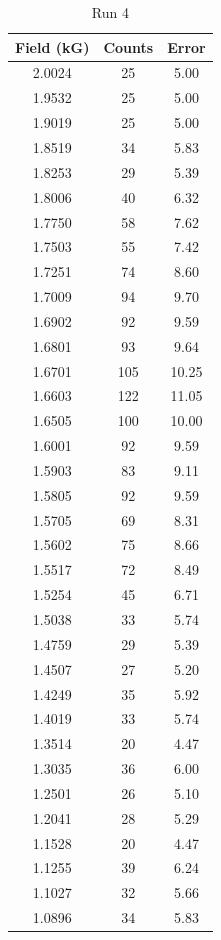 \begin{table}[h!]
\caption{Run 4}
\begin{tabular}{|c|c|c|} \hline
Field (kG)	&	Counts	&	Error	\\ \hline
2.0024	&	25	&	5.00	\\ \hline
1.9532	&	25	&	5.00	\\ \hline
1.9019	&	25	&	5.00	\\ \hline
1.8519	&	34	&	5.83	\\ \hline
1.8253	&	29	&	5.39	\\ \hline
1.8006	&	40	&	6.32	\\ \hline
1.7750	&	58	&	7.62	\\ \hline
1.7503	&	55	&	7.42	\\ \hline
1.7251	&	74	&	8.60	\\ \hline
1.7009	&	94	&	9.70	\\ \hline
1.6902	&	92	&	9.59	\\ \hline
1.6801	&	93	&	9.64	\\ \hline
1.6701	&	105	&	10.25	\\ \hline
1.6603	&	122	&	11.05	\\ \hline
1.6505	&	100	&	10.00	\\ \hline
1.6001	&	92	&	9.59	\\ \hline
1.5903	&	83	&	9.11	\\ \hline
1.5805	&	92	&	9.59	\\ \hline
1.5705	&	69	&	8.31	\\ \hline
1.5602	&	75	&	8.66	\\ \hline
1.5517	&	72	&	8.49	\\ \hline
1.5254	&	45	&	6.71	\\ \hline
1.5038	&	33	&	5.74	\\ \hline
1.4759	&	29	&	5.39	\\ \hline
1.4507	&	27	&	5.20	\\ \hline
1.4249	&	35	&	5.92	\\ \hline
1.4019	&	33	&	5.74	\\ \hline
1.3514	&	20	&	4.47	\\ \hline
1.3035	&	36	&	6.00	\\ \hline
1.2501	&	26	&	5.10	\\ \hline
1.2041	&	28	&	5.29	\\ \hline
1.1528	&	20	&	4.47	\\ \hline
1.1255	&	39	&	6.24	\\ \hline
1.1027	&	32	&	5.66	\\ \hline
1.0896	&	34	&	5.83	\\ \hline

\end{tabular}
\end{table}
